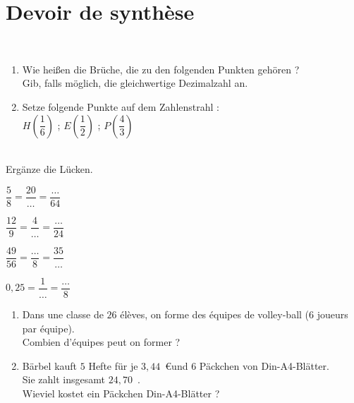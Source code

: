 \documentclass[10pt,openany]{book}
\begin{document}
\section*{Devoir de synth\`ese}

\begin{multicols}{2}
\\
\begin{enumerate}
\item Wie hei\ss en die Br\"uche, die zu den folgenden Punkten geh\"oren ?\\
  Gib, falls m\"oglich, die gleichwertige Dezimalzahl an.
  
\begin{DroiteGraduee}[none]{8}{0}{13}{1}{1}{0}{0}
\end{DroiteGraduee}

\columnbreak
\item Setze folgende Punkte auf dem Zahlenstrahl : \\
$H(\dfrac{1}{6})$ ; $E(\dfrac{1}{2})$ ; $P(\dfrac{4}{3})$

\begin{DroiteGraduee}[none]{8}{0}{13}{1}{1}{0}{0}
\end{DroiteGraduee}

\end{enumerate}

\end{multicols}

\\
Erg\"anze die L\"ucken.\\
\begin{multicols}{4}
$\dfrac{5}{8}=\dfrac{20}{\ldots}=\dfrac{\ldots}{64}$

\columnbreak

$\dfrac{12}{9}=\dfrac{4}{\ldots}=\dfrac{\ldots}{24}$
\columnbreak

$\dfrac{49}{56}=\dfrac{\ldots}{8}=\dfrac{35}{\ldots}$

\columnbreak

$0,25=\dfrac{1}{\ldots}=\dfrac{\ldots}{8}$

\end{multicols}

\begin{enumerate}
\item Dans une classe de $26$ \'el\`eves, on forme des \'equipes de volley-ball ($6$ joueurs par \'equipe).\\
Combien d'\'equipes peut on former ?

\item B\"arbel kauft $5$ Hefte f\"ur  je $3,44$~\euro und $6$ P\"ackchen von Din-A4-Bl\"atter.\\
Sie zahlt insgesamt $24,70$~\eurosans.\\
Wieviel kostet ein P\"ackchen Din-A4-Bl\"atter ?
\end{enumerate}
\end{document}
